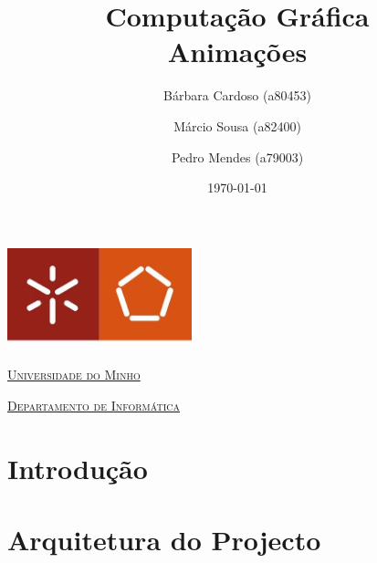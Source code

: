 \documentclass[a4paper]{article}
\begin{document}
\title{Computação Gráfica\\ Animações}
\author{Bárbara Cardoso (a80453) \and Márcio Sousa (a82400) \and Pedro Mendes (a79003)}
\date{\today}

\begin{titlepage}

    \thispagestyle{empty}
    \begin{center}
        \begin{minipage}{0.75\linewidth}
            \centering
            \includegraphics[width=0.4\textwidth]{eng.jpeg}\par\vspace{1cm}
            \vspace{1.5cm}
            \href{https://www.uminho.pt/PT}{\scshape\LARGE Universidade do Minho} \par
            \vspace{1cm}
            \href{https://www.di.uminho.pt/}{\scshape\Large Departamento de Informática} \par
            \vspace{1.5cm}

            \maketitle
        \end{minipage}
    \end{center}

\end{titlepage}

\tableofcontents

\pagebreak

\section{Introdução}

\pagebreak


\section{Arquitetura do Projecto}
\end{document}
